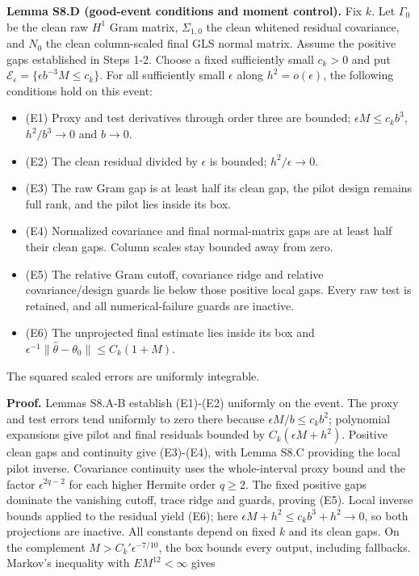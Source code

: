 \documentclass[
  american,
  11pt,
]{article}
\providecommand{\tightlist}{%
  \setlength{\itemsep}{0pt}\setlength{\parskip}{0pt}}
\begin{document}
\textbf{Lemma S8.D (good-event conditions and moment control).} Fix
\(k\). Let \(\Gamma_0\) be the clean raw \(H^1\) Gram matrix,
\(\Sigma_{1,0}\) the clean whitened residual covariance, and \(N_0\) the
clean column-scaled final GLS normal matrix. Assume the positive gaps
established in Steps 1-2. Choose a fixed sufficiently small \(c_k>0\)
and put \(\mathcal E_\epsilon=\{\epsilon b^{-3}M\leq c_k\}\). For all
sufficiently small \(\epsilon\) along \(h^2=o(\epsilon)\), the following
conditions hold on this event:

\begin{itemize}
\tightlist
\item
  (E1) Proxy and test derivatives through order three are bounded;
  \(\epsilon M\leq c_kb^3\), \(h^2/b^3\to0\) and \(b\to0\).
\item
  (E2) The clean residual divided by \(\epsilon\) is bounded;
  \(h^2/\epsilon\to0\).
\item
  (E3) The raw Gram gap is at least half its clean gap, the pilot design
  remains full rank, and the pilot lies inside its box.
\item
  (E4) Normalized covariance and final normal-matrix gaps are at least
  half their clean gaps. Column scales stay bounded away from zero.
\item
  (E5) The relative Gram cutoff, covariance ridge and relative
  covariance/design guards lie below those positive local gaps. Every
  raw test is retained, and all numerical-failure guards are inactive.
\item
  (E6) The unprojected final estimate lies inside its box and
  \(\epsilon^{-1}\|\widehat\theta-\theta_0\|\leq C_k(1+M)\).
\end{itemize}

The squared scaled errors are uniformly integrable.

\textbf{Proof.} Lemmas S8.A-B establish (E1)-(E2) uniformly on the
event. The proxy and test errors tend uniformly to zero there because
\(\epsilon M/b\leq c_kb^2\); polynomial expansions give pilot and final
residuals bounded by \(C_k(\epsilon M+h^2)\). Positive clean gaps and
continuity give (E3)-(E4), with Lemma S8.C providing the local pilot
inverse. Covariance continuity uses the whole-interval proxy bound and
the factor \(\epsilon^{2q-2}\) for each higher Hermite order \(q\geq2\).
The fixed positive gaps dominate the vanishing cutoff, trace ridge and
guards, proving (E5). Local inverse bounds applied to the residual yield
(E6); here \(\epsilon M+h^2\leq c_k b^3+h^2\to0\), so both projections
are inactive. All constants depend on fixed \(k\) and its clean gaps. On
the complement \(M>C_k'\epsilon^{-7/10}\), the box bounds every output,
including fallbacks. Markov's inequality with \(E M^{12}<\infty\) gives
\end{document}
